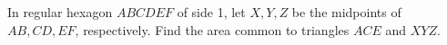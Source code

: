 In regular hexagon $ABCDEF$ of side 1, let $X,Y,Z$ be the midpoints of $AB,CD,EF$, respectively. Find the area common to triangles $ACE$ and $XYZ$.
